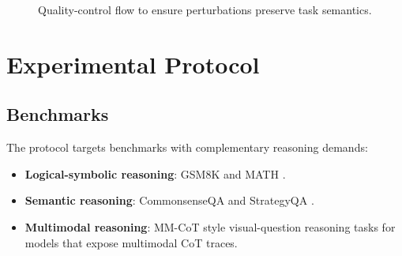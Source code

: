 \documentclass[conference]{IEEEtran}
\begin{document}
\begin{figure}[!t]
\centering
{}
\caption{Quality-control flow to ensure perturbations preserve task semantics.}
\label{fig:qa-flow}
\end{figure}

\section{Experimental Protocol}
\subsection{Benchmarks}
The protocol targets benchmarks with complementary reasoning demands:
\begin{itemize}[leftmargin=*]
\item \textbf{Logical-symbolic reasoning}: GSM8K and MATH \cite{cobbe2021gsm8k,hendrycks2021math}.
\item \textbf{Semantic reasoning}: CommonsenseQA and StrategyQA \cite{talmor2019commonsenseqa,talmor2020strategyqa}.
\item \textbf{Multimodal reasoning}: MM-CoT style visual-question reasoning tasks for models that expose multimodal CoT traces.
\end{itemize}

\begin{table}[!t]
\caption{Benchmark Coverage and Reasoning Characteristics}
\label{tab:benchmarks}
\centering
{}
\end{table}
\end{document}
